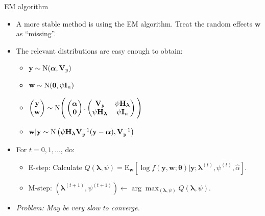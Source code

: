 \documentclass[]{beamer}\usepackage[]{graphicx}\usepackage[]{color}
\newcommand{\N}{\text{\normalfont N}}
\begin{document}
\begin{frame}{EM algorithm}
	\begin{itemize}
		\item A more stable method is using the EM algorithm. Treat the random effects $\mathbf w$ as ``missing''.
		\pause
		\item The relevant distributions are easy enough to obtain:
		\begin{itemize}
			\item $\mathbf y \sim \N(\boldsymbol\alpha, \mathbf V_y)$ \vspace{1pt}
			\item $\mathbf w \sim \N(\mathbf 0, \psi\mathbf I_n)$ \vspace{3pt}
			\item $\begin{pmatrix}\mathbf y \\ \mathbf w\end{pmatrix} \sim \N\Bigg(\begin{pmatrix}\boldsymbol\alpha\\\mathbf 0\end{pmatrix}, \begin{pmatrix} \mathbf V_y & \mathbf \psi \mathbf H_{\boldsymbol\lambda} \\ \psi\mathbf H_{\boldsymbol\lambda} & \psi\mathbf I_n \end{pmatrix}\Bigg)$ \vspace{2pt}
			\item $\mathbf w | \mathbf y \sim \N\left(\psi\mathbf H_{\boldsymbol\lambda} \mathbf V_y^{-1} (\mathbf y - \boldsymbol\alpha), \mathbf V_y^{-1}\right)$
		\end{itemize}
		\pause
		\vspace{0.5mm}
		\item For $t = 0, 1, \dots$, do:
		\begin{itemize}
			\item E-step: Calculate $Q(\boldsymbol\lambda, \psi) = \text{E}_{\mathbf w} \left[\log f(\mathbf y, \mathbf w ; \boldsymbol\theta)  | \mathbf y; \boldsymbol\lambda^{(t)}, \psi^{(t)}, \hat\alpha \right]$.

			\item M-step: $(\boldsymbol\lambda^{(t+1)}, \psi^{(t+1)}) \gets \arg\max_{(\boldsymbol\lambda, \psi)} Q(\boldsymbol\lambda, \psi)$.
		\end{itemize}

		\pause
		\vspace{0.5mm}
		\item \textit{Problem: May be very slow to converge.}
	\end{itemize}
\end{frame}
\end{document}
